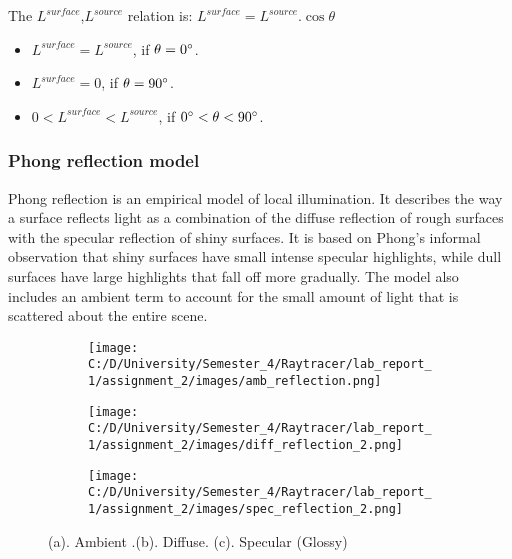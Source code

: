 \documentclass{article}
\begin{document}
The  $L^{surface}$,$ L^{source}$ relation is: $L^{surface} = L^{source}.\cos \theta $
\begin{itemize}
	\item $L^{surface} = L^{source}$, if $\theta = 0\degree$.
	\item $L^{surface} = 0$, if $\theta = 90\degree$.
    \item $0 < L^{surface} < L^{source}$, if $0\degree < \theta  < 90\degree$.
\end{itemize}

\subsubsection{Phong reflection model }
Phong reflection is an empirical model of local illumination. It describes the way a surface reflects light as a combination of the diffuse reflection of rough surfaces with the specular reflection of shiny surfaces. It is based on Phong's informal observation that shiny surfaces have small intense specular highlights, while dull surfaces have large highlights that fall off more gradually. The model also includes an ambient term to account for the small amount of light that is scattered about the entire scene.
\\


\begin{figure}[ht]
	\begin{subfigure}{.3\textwidth}
		\centering
		\texttt{[image: C:/D/University/Semester\_4/Raytracer/lab\_report\_1/assignment\_2/images/amb\_reflection.png]}  
		\caption{}
		\label{fig:sub-first}
	\end{subfigure}
	\begin{subfigure}{.3\textwidth}
		\centering
		\texttt{[image: C:/D/University/Semester\_4/Raytracer/lab\_report\_1/assignment\_2/images/diff\_reflection\_2.png]}  
		\caption{}
		\label{fig:sub-second}
	\end{subfigure}
	\begin{subfigure}{.3\textwidth}
		\centering
		\texttt{[image: C:/D/University/Semester\_4/Raytracer/lab\_report\_1/assignment\_2/images/spec\_reflection\_2.png]}  
		\caption{}
		\label{fig:sub-third}
	\end{subfigure}
	
	\caption{(a). Ambient .(b). Diffuse. (c). Specular (Glossy)}
	\label{fig:fig}
\end{figure}
\end{document}
